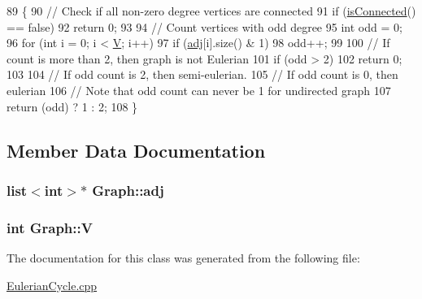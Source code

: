 \begin{DoxyCode}
89 \{
90     \textcolor{comment}{// Check if all non-zero degree vertices are connected}
91     \textcolor{keywordflow}{if} (\hyperlink{classGraph_add6f4a13a70d1b15f370db0bd4669b90}{isConnected}() == \textcolor{keyword}{false})
92         \textcolor{keywordflow}{return} 0;
93  
94     \textcolor{comment}{// Count vertices with odd degree}
95     \textcolor{keywordtype}{int} odd = 0;
96     \textcolor{keywordflow}{for} (\textcolor{keywordtype}{int} i = 0; i < \hyperlink{classGraph_a2b722f7cfa7a21e4cb5fae488b3d4dcc}{V}; i++)
97         \textcolor{keywordflow}{if} (\hyperlink{classGraph_a04ab9c17ad31aa036def8db0f88b035b}{adj}[i].size() & 1)
98             odd++;
99  
100     \textcolor{comment}{// If count is more than 2, then graph is not Eulerian}
101     \textcolor{keywordflow}{if} (odd > 2)
102         \textcolor{keywordflow}{return} 0;
103  
104     \textcolor{comment}{// If odd count is 2, then semi-eulerian.}
105     \textcolor{comment}{// If odd count is 0, then eulerian}
106     \textcolor{comment}{// Note that odd count can never be 1 for undirected graph}
107     \textcolor{keywordflow}{return} (odd) ? 1 : 2;
108 \}
\end{DoxyCode}


\subsection{Member Data Documentation}
\subsubsection[{\texorpdfstring{adj}{adj}}]{\setlength{\rightskip}{0pt plus 5cm}list$<$int$>$$\ast$ Graph\+::adj\hspace{0.3cm}{\ttfamily [private]}}\hypertarget{classGraph_a04ab9c17ad31aa036def8db0f88b035b}{}\label{classGraph_a04ab9c17ad31aa036def8db0f88b035b}
\subsubsection[{\texorpdfstring{V}{V}}]{\setlength{\rightskip}{0pt plus 5cm}int Graph\+::V\hspace{0.3cm}{\ttfamily [private]}}\hypertarget{classGraph_a2b722f7cfa7a21e4cb5fae488b3d4dcc}{}\label{classGraph_a2b722f7cfa7a21e4cb5fae488b3d4dcc}


The documentation for this class was generated from the following file\+:\begin{DoxyCompactItemize}
\item 
\hyperlink{EulerianCycle_8cpp}{Eulerian\+Cycle.\+cpp}\end{DoxyCompactItemize}
